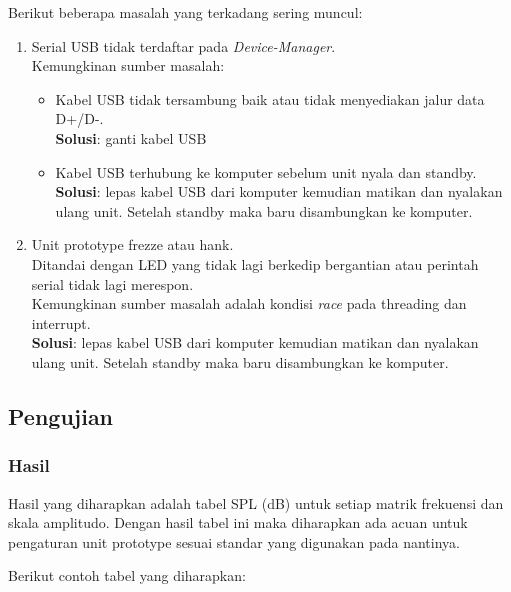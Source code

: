 \documentclass[12pt,]{article}
\begin{document}
	Berikut beberapa masalah yang terkadang sering muncul:
	\begin{enumerate}
		\item Serial USB tidak terdaftar pada \textit{Device-Manager}.\\
		Kemungkinan sumber masalah:
		\begin{itemize}
			\item Kabel USB tidak tersambung baik atau tidak menyediakan jalur data D+/D-.\\
			\textbf{Solusi}: ganti kabel USB
			
			\item Kabel USB terhubung ke komputer sebelum unit nyala dan standby.\\
			\textbf{Solusi}: lepas kabel USB dari komputer kemudian matikan dan nyalakan ulang unit.
			Setelah standby maka baru disambungkan ke komputer.
		\end{itemize}
	
		\item Unit prototype frezze atau hank.\\
		Ditandai dengan LED yang tidak lagi berkedip bergantian atau perintah serial tidak lagi merespon.\\
		Kemungkinan sumber masalah adalah kondisi \textit{race} pada threading dan interrupt.\\
		\textbf{Solusi}: lepas kabel USB dari komputer kemudian matikan dan nyalakan ulang unit.
		Setelah standby maka baru disambungkan ke komputer.
	\end{enumerate}

	\newpage
	\subsection{Pengujian}
	
	\subsubsection{Hasil}
	
	Hasil yang diharapkan adalah tabel SPL (dB) untuk setiap matrik frekuensi dan skala amplitudo.
	Dengan hasil tabel ini maka diharapkan ada acuan untuk pengaturan unit prototype sesuai standar yang digunakan pada nantinya.
	
	Berikut contoh tabel yang diharapkan:
	
\end{document}
